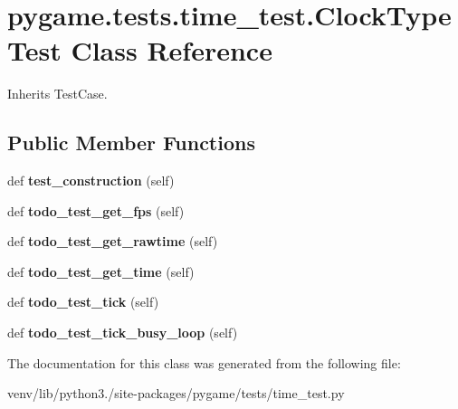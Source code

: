 \hypertarget{classpygame_1_1tests_1_1time__test_1_1_clock_type_test}{}\section{pygame.\+tests.\+time\+\_\+test.\+Clock\+Type\+Test Class Reference}
\label{classpygame_1_1tests_1_1time__test_1_1_clock_type_test}


Inherits Test\+Case.

\subsection*{Public Member Functions}
\begin{DoxyCompactItemize}
\item 
\mbox{\label{classpygame_1_1tests_1_1time__test_1_1_clock_type_test_a552949b56005af3e8a3dda016bb7fef0}} 
def {\bfseries test\+\_\+construction} (self)
\item 
\mbox{\label{classpygame_1_1tests_1_1time__test_1_1_clock_type_test_a56dad7573dcc1b20e406a10f000a18c9}} 
def {\bfseries todo\+\_\+test\+\_\+get\+\_\+fps} (self)
\item 
\mbox{\label{classpygame_1_1tests_1_1time__test_1_1_clock_type_test_aec2acded29b87658925b7af66dad66f2}} 
def {\bfseries todo\+\_\+test\+\_\+get\+\_\+rawtime} (self)
\item 
\mbox{\label{classpygame_1_1tests_1_1time__test_1_1_clock_type_test_a7b300a9d863834f8c5e96d0850d6da27}} 
def {\bfseries todo\+\_\+test\+\_\+get\+\_\+time} (self)
\item 
\mbox{\label{classpygame_1_1tests_1_1time__test_1_1_clock_type_test_a790be4cea631873c1b32c8c17afc5245}} 
def {\bfseries todo\+\_\+test\+\_\+tick} (self)
\item 
\mbox{\label{classpygame_1_1tests_1_1time__test_1_1_clock_type_test_ac35e8796d59aa35be97b62d389dea873}} 
def {\bfseries todo\+\_\+test\+\_\+tick\+\_\+busy\+\_\+loop} (self)
\end{DoxyCompactItemize}


The documentation for this class was generated from the following file\+:\begin{DoxyCompactItemize}
\item 
venv/lib/python3./site-\/packages/pygame/tests/time\+\_\+test.\+py\end{DoxyCompactItemize}
